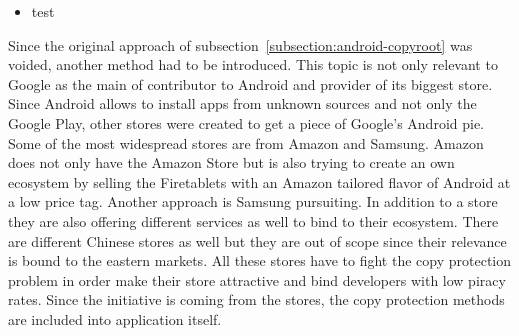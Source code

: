 \begin{itemize}
    \item test
\end{itemize}
Since the original approach of subsection~\ref{subsection:android-copyroot} was voided, another method had to be introduced.
This topic is not only relevant to Google as the main of contributor to Android and provider of its biggest store.
Since Android allows to install apps from unknown sources and not only the Google Play, other stores were created to get a piece of Google's Android pie.
Some of the most widespread stores are from Amazon and Samsung.
Amazon does not only have the Amazon Store but is also trying to create an own ecosystem by selling the Firetablets with an Amazon tailored flavor of Android at a low price tag.
Another approach is Samsung pursuiting. In addition to a store they are also offering different services as well to bind to their ecosystem.
There are different Chinese stores as well but they are out of scope since their relevance is bound to the eastern markets.
\newline
All these stores have to fight the copy protection problem in order make their store attractive and bind developers with low piracy rates.
Since the initiative is coming from the stores, the copy protection methods are included into application itself. \cite{munteanLicense}




